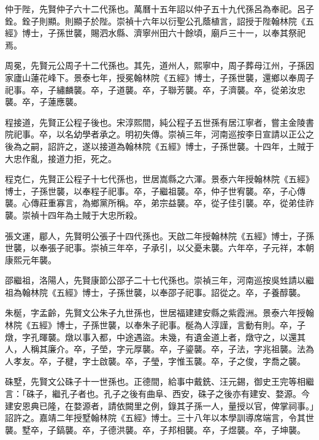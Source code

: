 \begin{pinyinscope}
仲于陛，先賢仲子六十二代孫也。萬曆十五年詔以仲子五十九代孫呂為奉祀。呂子銓。銓子則顯。則顯子於陛。崇禎十六年以衍聖公孔蔭植言，詔授于陛翰林院《五經》博士，子孫世襲，賜泗水縣、濟寧州田六十餘頃，廟戶三十一，以奉其祭祀焉。

周冕，先賢元公周子十二代孫也。其先，道州人，熙寧中，周子葬母江州，子孫因家廬山蓮花峰下。景泰七年，授冕翰林院《五經》博士，子孫世襲，還鄉以奉周子祀事。卒，子繡麟襲。卒，子道襲。卒，子聯芳襲。卒，子濟襲。卒，從弟汝忠襲。卒，子蓮應襲。

程接道，先賢正公程子後也。宋淳熙間，純公程子五世孫有居江寧者，嘗主金陵書院祀事。卒，以名幼學者承之。明初失傳。崇禎三年，河南巡按李日宣請以正公之後為之嗣，詔許之，遂以接道為翰林院《五經》博士，子孫世襲。十四年，土賊于大忠作亂，接道力拒，死之。

程克仁，先賢正公程子十七代孫也，世居嵩縣之六渾。景泰六年授翰林院《五經》博士，子孫世襲，以奉程子祀事。卒，子繼祖襲。卒，仲子世宥襲。卒，子心傳襲。心傳莊重寡言，為鄉黨所稱。卒，弟宗益襲。卒，從子佳引襲。卒，從弟佳祚襲。崇禎十四年為土賊于大忠所殺。

張文運，郿人，先賢明公張子十四代孫也。天啟二年授翰林院《五經》博士，子孫世襲，以奉張子祀事。崇禎三年卒，子承引，以父憂未襲。六年卒，子元祥，本朝康熙元年襲。

邵繼祖，洛陽人，先賢康節公邵子二十七代孫也。崇禎三年，河南巡按吳甡請以繼祖為翰林院《五經》博士，子孫世襲，以奉邵子祀事。詔從之。卒，子養醇襲。

朱梴，字孟齡，先賢文公朱子九世孫也，世居福建建安縣之紫霞洲。景泰六年授翰林院《五經》博士，子孫世襲，以奉朱子祀事。梴為人淳謹，言動有則。卒，子燉，字孔暉襲。燉以事入都，中途遇盜。未幾，有遺金道上者，燉守之，以還其人，人稱其廉介。卒，子塋，字元厚襲。卒，子鎏襲。卒，子法，字兆祖襲。法為人孝友。卒，子楗，字士啟襲。卒，子瑩，字惟玉襲。卒，子之俊，字喬之襲。

硃墅，先賢文公硃子十一世孫也。正德間，給事中戴銑、汪元錫，御史王完等相繼言：「硃子，繼孔子者也。孔子之後有曲阜、西安，硃子之後亦有建安、婺源。今建安恩典已隆，在婺源者，請依闕里之例，錄其子孫一人，量授以官，俾掌祠事。」詔許之。嘉靖二年授墅翰林院《五經》博士。三十八年以本學訓導席端言，令其世襲。墅卒，子鎬襲。卒，子德洪襲。卒，子邦相襲。卒，子煜襲。卒，子坤襲。


\end{pinyinscope}